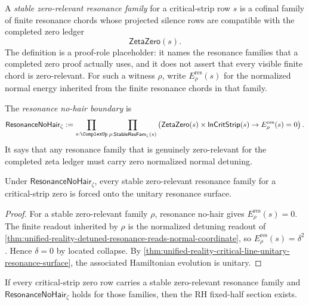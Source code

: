 \begin{definition}
\label{def:unified-reality-stable-zero-relevant-resonance-family}
A \emph{stable zero-relevant resonance family} for a critical-strip row
$s$ is a cofinal family of finite resonance chords whose projected
silence rows are compatible with the completed zero ledger
$$
\mathsf{ZetaZero}(s).
$$
The definition is a proof-role placeholder: it names the resonance
families that a completed zero proof actually uses, and it does not
assert that every visible finite chord is zero-relevant.
For such a witness $\rho$, write $E_{\rho}^{\mathrm{res}}(s)$ for the
normalized normal energy inherited from the finite resonance chords in
that family.
\end{definition}

\begin{definition}
\label{def:unified-reality-resonance-no-hair-boundary}
The \emph{resonance no-hair boundary} is
$$
\mathsf{ResonanceNoHair}_{\zeta}
:=
\prod_{s:\ComplexUp}
\prod_{\rho:\mathsf{StableResFam}_{\zeta}(s)}
\left(
\mathsf{ZetaZero}(s)
\times
\mathsf{InCritStrip}(s)
\to
E_{\rho}^{\mathrm{res}}(s)=0
\right).
$$
It says that any resonance family that is genuinely zero-relevant for
the completed zeta ledger must carry zero normalized normal detuning.
\end{definition}

\begin{corollary}
\label{cor:unified-reality-resonance-no-hair-stable-unitarity}
Under $\mathsf{ResonanceNoHair}_{\zeta}$, every stable zero-relevant
resonance family for a critical-strip zero is forced onto the unitary
resonance surface.
\end{corollary}

\begin{proof}
For a stable zero-relevant family $\rho$, resonance no-hair gives
$E_{\rho}^{\mathrm{res}}(s)=0$.  The finite readout inherited by $\rho$
is the normalized detuning readout of
\autoref{thm:unified-reality-detuned-resonance-reads-normal-coordinate},
so $E_{\rho}^{\mathrm{res}}(s)=\delta^2$.  Hence $\delta=0$ by located
collapse.  By
\autoref{thm:unified-reality-critical-line-unitary-resonance-surface},
the associated Hamiltonian evolution is unitary.
\end{proof}

\begin{theorem}
\label{thm:unified-reality-resonance-no-hair-conditionally-sufficient}
If every critical-strip zero row carries a stable zero-relevant resonance
family and $\mathsf{ResonanceNoHair}_{\zeta}$ holds for those families,
then the RH fixed-half section exists.
\end{theorem}

